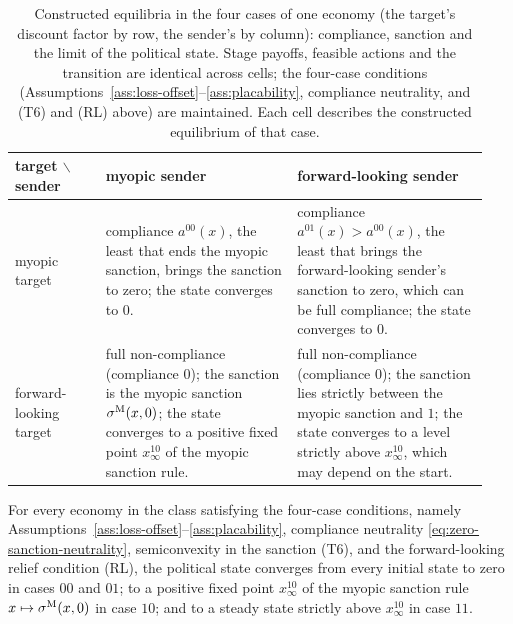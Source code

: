 \begin{table}[htbp]
\centering\footnotesize
\caption{Constructed equilibria in the four cases of one economy (the target's
discount factor by row, the sender's by column): compliance, sanction and the
limit of the political state. Stage payoffs, feasible actions and the transition
are identical across cells; the four-case conditions
(Assumptions~\ref{ass:loss-offset}--\ref{ass:placability}, compliance neutrality,
and \textup{(T6)} and \textup{(RL)} above) are maintained. Each cell describes the constructed equilibrium of that case.}
\label{tab:four-cells}
\begin{tabular}{@{}p{0.18\linewidth}p{0.38\linewidth}p{0.38\linewidth}@{}}
\toprule
target $\backslash$ sender & myopic sender & forward-looking sender \\
\midrule
myopic target & compliance $a^{00}(x)$, the least that ends the myopic sanction, brings the sanction to zero; the state converges to $0$. & compliance $a^{01}(x)>a^{00}(x)$, the least that brings the forward-looking sender's sanction to zero, which can be full compliance; the state converges to $0$. \\
forward-looking target & full non-compliance (compliance $0$); the sanction is the myopic sanction $\sigma^{\mathrm{M}}(x,0)$; the state converges to a positive fixed point $x^{10}_\infty$ of the myopic sanction rule. & full non-compliance (compliance $0$); the sanction lies strictly between the myopic sanction and $1$; the state converges to a level strictly above $x^{10}_\infty$, which may depend on the start. \\
\bottomrule
\end{tabular}
\end{table}

\begin{theorem}
\label{thm:four-cells}
For every economy in the class satisfying the four-case
conditions, namely Assumptions~\ref{ass:loss-offset}--\ref{ass:placability}, compliance
neutrality \eqref{eq:zero-sanction-neutrality}, semiconvexity in the sanction
\textup{(T6)}, and the forward-looking relief condition \textup{(RL)}, the political state
converges from every initial state to zero in cases $00$ and $01$; to a
positive fixed point $x^{10}_\infty$ of the myopic sanction rule $x\mapsto\sigma^{\mathrm{M}}(x,0)$
in case $10$; and to a steady state strictly above $x^{10}_\infty$ in case $11$.
\end{theorem}

